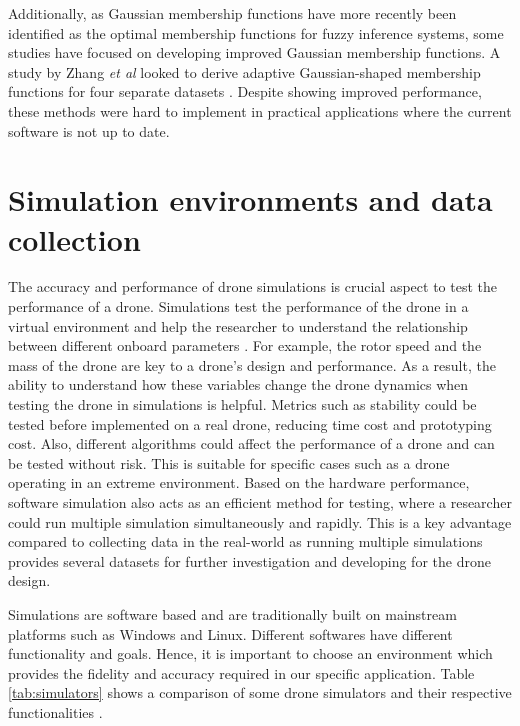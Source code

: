 Additionally, as Gaussian membership functions have more recently been identified as the optimal membership functions for fuzzy inference systems, some studies have focused on developing improved Gaussian membership functions. A study by Zhang \textit{et al} looked to derive adaptive Gaussian-shaped membership functions for four separate datasets \cite{zain6}. Despite showing improved performance, these methods were hard to implement in practical applications where the current software is not up to date.

\section{Simulation environments and data collection}
The accuracy and performance of drone simulations is crucial aspect to test the performance of a drone. Simulations test the performance of the drone in a virtual environment and help the researcher to understand the relationship between different onboard parameters \cite{roy1}. For example, the rotor speed and the mass of the drone are key to a drone's design and performance. As a result, the ability to understand how these variables change the drone dynamics when testing the drone in simulations is helpful. Metrics such as stability could be tested before implemented on a real drone, reducing time cost and prototyping cost. Also, different algorithms could affect the performance of a drone and can be tested without risk. This is suitable for specific cases such as a drone operating in an extreme environment. Based on the hardware performance, software simulation also acts as an efficient method for testing, where a researcher could run multiple simulation simultaneously and rapidly. This is a key advantage compared to collecting data in the real-world as running multiple simulations provides several datasets for further investigation and developing for the drone design. 

Simulations are software based and are traditionally built on mainstream platforms such as Windows and Linux. Different softwares have different functionality and goals. Hence, it is important to choose an environment which provides the fidelity and accuracy required in our specific application. Table \ref{tab:simulators} shows a comparison of some drone simulators and their respective functionalities \cite{Roy5}. 

